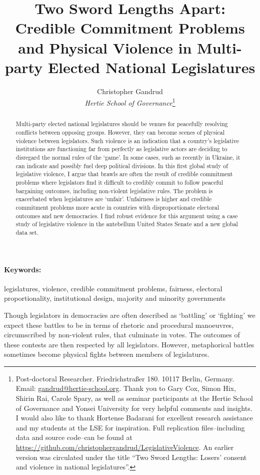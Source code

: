 \documentclass[a4paper]{article}\usepackage[]{graphicx}\usepackage[]{color}
\title{Two Sword Lengths Apart: Credible Commitment Problems and Physical Violence in Multi-party Elected National Legislatures}
\author{Christopher Gandrud \\
                {\emph{Hertie School of Governance}}\footnote{Post-doctoral Researcher. Friedrichstra{\ss}er 180. 10117 Berlin, Germany. Email: \href{mailto:gandrud@hertie-school.org}{gandrud@hertie-school.org}. Thank you to Gary Cox, Simon Hix, Shirin Rai, Carole Spary, as well as seminar participants at the Hertie School of Governance and Yonsei University for very helpful comments and insights. I would also like to thank Hortense Badarani for excellent research assistance and my students at the LSE for inspiration. Full replication files--including data and source code--can be found at \url{https://github.com/christophergandrud/LegislativeViolence}. An earlier version was circulated under the title ``Two Sword Lengths: Losers' consent and violence in national legislatures''.}}
\begin{document}
\maketitle

\begin{abstract}
Multi-party elected national legislatures should be venues for peacefully resolving conflicts between opposing groups. However, they can become scenes of physical violence between legislators. Such violence is an indication that a country's legislative institutions are functioning far from perfectly as legislative actors are deciding to disregard the normal rules of the `game'. In some cases, such as recently in Ukraine, it can indicate and possibly fuel deep political divisions. In this first global study of legislative violence, I argue that brawls are often the result of credible commitment problems where legislators find it difficult to credibly commit to follow peaceful bargaining outcomes, including non-violent legislative rules. The problem is exacerbated when legislatures are `unfair'. Unfairness is higher and credible commitment problems more acute in countries with disproportionate electoral outcomes and new democracies. I find robust evidence for this argument using a case study of legislative violence in the antebellum United States Senate and a new global data set.
\end{abstract}


\paragraph{Keywords:} legislatures, violence, credible commitment problems, fairness, electoral proportionality, institutional design, majority and minority governments

\vspace{0.3cm}


Though legislators in democracies are often described as `battling' or `fighting' we expect these battles to be in terms of rhetoric and procedural manoeuvres, circumscribed by non-violent rules, that culminate in votes. The outcomes of these contests are then respected by all legislators. However, metaphorical battles sometimes become physical fights between members of legislatures.
\end{document}
